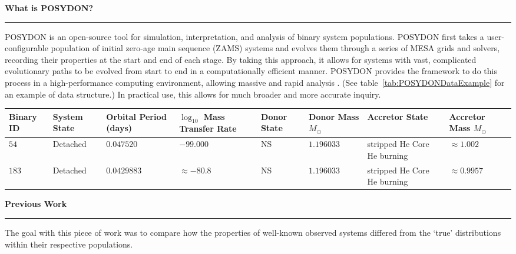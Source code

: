 \documentclass{article}
\newcommand{\smallfont}{\fontsize{18}{24}\selectfont}
\begin{document}
\begin{multicols}{4}
\begin{tcolorbox}[sectionbox=Introduction]
  \textbf{What is POSYDON?}
  \vspace{.5cm}
  \hrule
  \vspace{.5cm}
    POSYDON is an open-source tool for simulation, interpretation, and analysis of binary system populations. POSYDON first takes a user-configurable population of initial zero-age main sequence (ZAMS) systems and evolves them through a series of MESA grids and solvers, recording their properties at the start and end of each stage. By taking this approach, it allows for systems with vast, complicated evolutionary paths to be evolved from start to end in a computationally efficient manner. POSYDON provides the framework to do this process in a high-performance computing environment, allowing massive and rapid analysis \parencite{posydon2023}. (See table~\ref{tab:POSYDONDataExample} for an example of data structure.) In practical use, this allows for much broader and more accurate inquiry. 
    \vspace{4.5cm}
      \begin{center}
        \smallfont
        \begin{tabularx}{\linewidth}{||X | X | X | X | X | X | X | X ||}
          \hline
          \textbf{Binary ID} &
          \textbf{System State} &
          \textbf{Orbital Period (days)} &
          \boldmath$\log_{10}$ \textbf{Mass Transfer Rate} &
          \textbf{Donor State} &
          \textbf{Donor Mass} $M_\odot$ &
          \textbf{Accretor State} &
          \textbf{Accretor Mass} $M_\odot$
          \\ \hline \hline
          $54$ & Detached & $0.047520$ & $-99.000$ & NS & $1.196033$ & stripped He Core He burning & $\approx 1.002$ \\
          \hline
          $183$ & Detached & $0.0429883$ & $\approx -80.8$ & NS & $1.196033$ & stripped He Core He burning & $\approx 0.9957$ \\
          \hline
        \end{tabularx}
        \label{tab:POSYDONDataExample}
      \end{center}
  \textbf{Previous Work}
  \vspace{.5cm}
  \hrule
  \vspace{.5cm}
    The goal with this piece of work was to compare how the properties of well-known observed systems differed from the `true' distributions within their respective populations.
          

\end{tcolorbox}
\end{multicols}
\end{document}
